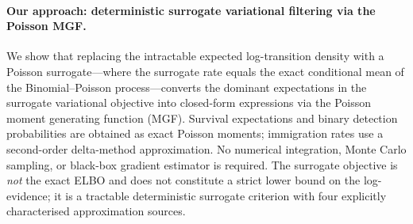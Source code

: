 \documentclass[review,12pt]{elsarticle}
\theoremstyle{definition}
\begin{document}
\paragraph{Our approach: deterministic surrogate variational filtering via the Poisson MGF.}
We show that replacing the intractable expected log-transition density with a
Poisson surrogate---where the surrogate rate equals the exact conditional mean
of the Binomial--Poisson process---converts the dominant expectations in the
surrogate variational objective into closed-form expressions via the Poisson
moment generating function (MGF).  Survival expectations and binary detection
probabilities are obtained as exact Poisson moments; immigration rates use a
second-order delta-method approximation.  No numerical integration, Monte Carlo
sampling, or black-box gradient estimator is required.  The surrogate objective
is \emph{not} the exact ELBO and does not constitute a strict lower bound on
the log-evidence; it is a tractable deterministic surrogate criterion with four explicitly
characterised approximation sources.
\end{document}
